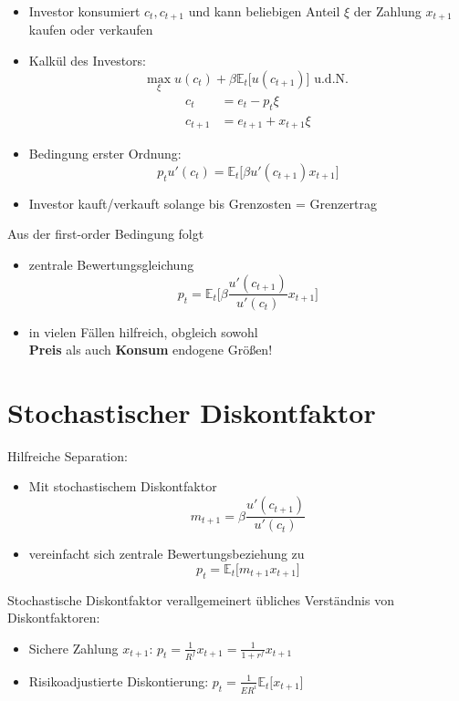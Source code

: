 \documentclass[12pt]{extreport} %
\theoremstyle{named}
\theoremstyle{nnamed}
\theoremstyle{itshape}
\theoremstyle{normal}
\begin{document}
\begin{itemize}
	\item Investor konsumiert $c_t, c_{t+1}$ und kann beliebigen Anteil $\xi$ der Zahlung $x_{t+1}$ kaufen oder verkaufen
	\item Kalkül des Investors:
		$$ \max_{\xi} u(c_t) + \beta \mathbb{E}_t \big[ u(c_{t+1}) \big] \text{ u.d.N. } $$
		\begin{align*}
			c_{t} & = e_t - p_t \xi \\
			c_{t+1} & = e_{t+1} + x_{t+1} \xi
		\end{align*}
	\item Bedingung erster Ordnung:
		$$ p_t u'(c_t) = \mathbb{E}_t \big[ \beta u'(c_{t+1}) x_{t+1} \big] $$
	\item Investor kauft/verkauft solange bis Grenzosten = Grenzertrag
\end{itemize} \newpage

Aus der first-order Bedingung folgt 
\begin{itemize}
	\item zentrale Bewertungsgleichung
	$$ p_t = \mathbb{E}_t \big[ \beta \frac{u'(c_{t+1})}{u'(c_t)} x_{t+1} \big] $$
	\item in vielen Fällen hilfreich, obgleich sowohl \\
		\textbf{Preis} als auch \textbf{Konsum} endogene Größen!
\end{itemize}

\section{Stochastischer Diskontfaktor}

Hilfreiche Separation:

\begin{itemize}
	\item Mit stochastischem Diskontfaktor
	 $$ m_{t+1} = \beta \frac{u'(c_{t+1})}{u'(c_t)} $$
	\item vereinfacht sich zentrale Bewertungsbeziehung zu
	 $$ p_t = \mathbb{E}_t \big[ m_{t+1} x_{t+1} \big] $$
\end{itemize}

Stochastische Diskontfaktor verallgemeinert übliches Verständnis von Diskontfaktoren:

\begin{itemize}
	\item Sichere Zahlung $x_{t+1}$: $p_t = \frac{1}{R^f} x_{t+1} = \frac{1}{1+r^f} x_{t+1}$
	\item Risikoadjustierte Diskontierung: $p_t = \frac{1}{ER^i} \mathbb{E}_t \big[ x_{t+1} \big]$
\end{itemize}
\end{document}
